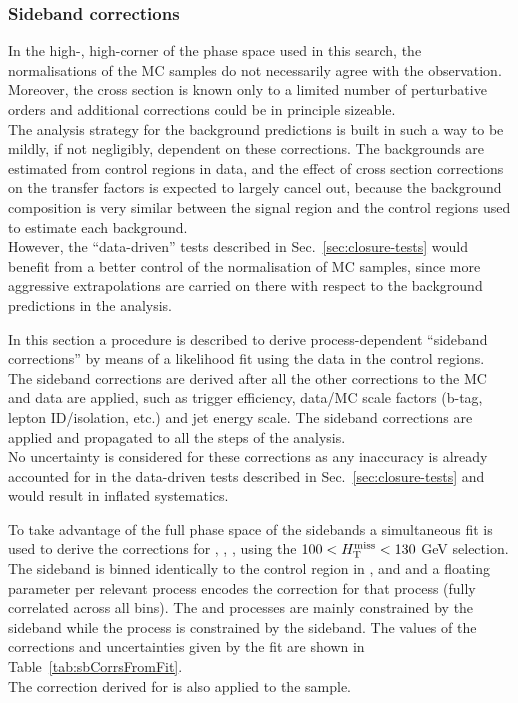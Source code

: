 \subsubsection{Sideband corrections}
\label{sec:sideband-corrections}

In the high-\scalht, high-\etmiss corner of the phase space used in this search, the normalisations of the MC samples do not necessarily agree with the observation. 
Moreover, the cross section is known only to a limited number of perturbative orders and additional corrections could be in principle sizeable. \\
The analysis strategy for the background predictions is built in such a way to be mildly, if not negligibly, dependent on these corrections. 
The backgrounds are estimated from control regions in data, and the effect of cross section corrections on the transfer factors is expected to largely cancel out, 
because the background composition is very similar between the signal region and the control regions used to estimate each background. \\
However, the ``data-driven'' tests described in Sec.~\ref{sec:closure-tests} would benefit from a better control of the normalisation of MC samples, 
since more aggressive extrapolations are carried on there with respect to the background predictions in the analysis. 

In this section a procedure is described to derive process-dependent ``sideband corrections'' 
by means of a likelihood fit using the data in the control regions. 
The sideband corrections are derived after all the other corrections to the MC and data are applied, 
such as trigger efficiency, data/MC scale factors (b-tag, lepton ID/isolation, etc.) and jet energy scale. 
The sideband corrections are applied and propagated to all the steps of the analysis.\\
No uncertainty is considered for these corrections as any inaccuracy is already accounted 
for in the data-driven tests described in Sec.~\ref{sec:closure-tests} and would result in inflated systematics. 

To take advantage of the full phase space of the sidebands a simultaneous 
fit is used to derive the corrections for \wj, \zj, \ttbar, using the $100<\mbox{$H_{\rm T}^{\rm miss}$}<130$ GeV selection. 
The sideband is binned identically to the control region in \njet, \nb and \scalht and a floating 
parameter per relevant process encodes the correction for that process (fully correlated across all bins).
The \wj and \ttbar processes are mainly constrained by the \mj sideband while the \zj process is 
constrained by the \mmj sideband. The values of the corrections and uncertainties
given by the fit are shown in Table~\ref{tab:sbCorrsFromFit}.\\
The correction derived for \zj is also applied to the \znunu sample. 

